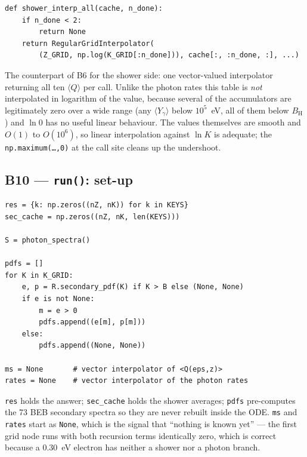 \documentclass[11pt,a4paper]{article}
\newcommand{\code}[1]{\texttt{\small #1}}
\newcommand{\BH}{B_{\mathrm{H}}}
\begin{document}
\begin{lstlisting}
def shower_interp_all(cache, n_done):
    if n_done < 2:
        return None
    return RegularGridInterpolator(
        (Z_GRID, np.log(K_GRID[:n_done])), cache[:, :n_done, :], ...)
\end{lstlisting}

The counterpart of B6 for the shower side: one vector-valued interpolator
returning all ten $\langle Q\rangle$ per call.  Unlike the photon rates this
table is \emph{not} interpolated in logarithm of the value, because several of
the accumulators are legitimately zero over a wide range (any $\langle
Y_\gamma\rangle$ below $10^5$~eV, all of them below $\BH$) and $\ln 0$ has no
useful linear behaviour.  The values themselves are smooth and $O(1)$ to
$O(10^6)$, so linear interpolation against $\ln K$ is adequate; the
\code{np.maximum(\ldots,0)} at the call site cleans up the undershoot.

\subsection*{B10 --- \code{run()}: set-up}

\begin{lstlisting}
res = {k: np.zeros((nZ, nK)) for k in KEYS}
sec_cache = np.zeros((nZ, nK, len(KEYS)))

S = photon_spectra()

pdfs = []
for K in K_GRID:
    e, p = R.secondary_pdf(K) if K > B else (None, None)
    if e is not None:
        m = e > 0
        pdfs.append((e[m], p[m]))
    else:
        pdfs.append((None, None))

ms = None       # vector interpolator of <Q(eps,z)>
rates = None    # vector interpolator of the photon rates
\end{lstlisting}

\code{res} holds the answer; \code{sec\_cache} holds the shower averages;
\code{pdfs} pre-computes the 73 BEB secondary spectra so they are never rebuilt
inside the ODE.  \code{ms} and \code{rates} start as \code{None}, which is the
signal that ``nothing is known yet'' --- the first grid node runs with both
recursion terms identically zero, which is correct because a $0.30$~eV electron
has neither a shower nor a photon branch.

\end{document}
